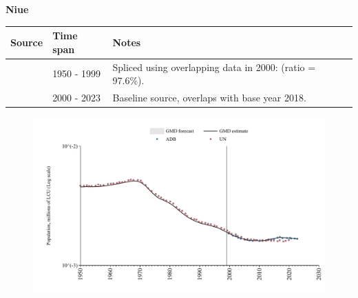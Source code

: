 \documentclass[12pt,a4paper,landscape]{article}
\begin{document}
\begin{adjustbox}{max totalsize={\paperwidth}{\paperheight},center}
\begin{minipage}[t][\textheight][t]{\textwidth}
\vspace*{0.5cm}
{}
\begin{center}
{\Large\bfseries Niue}
\end{center}
\vspace{0.5cm}
\begin{table}[H]
\centering
\small
\begin{tabular}{|l|l|l|}
\hline
\textbf{Source} & \textbf{Time span} & \textbf{Notes} \\
\hline
\rowcolor{white}\cite{UN}& 1950 - 1999 &Spliced using overlapping data in 2000: (ratio = 97.6\%).\\
\rowcolor{lightgray}\cite{ADB}& 2000 - 2023 &Baseline source, overlaps with base year 2018.\\
\hline
\end{tabular}
\end{table}
\begin{figure}[H]
\centering
\includegraphics[width=\textwidth,height=0.6\textheight,keepaspectratio]{graphs/NIU_pop.pdf}
\end{figure}
\end{minipage}
\end{adjustbox}
\end{document}
